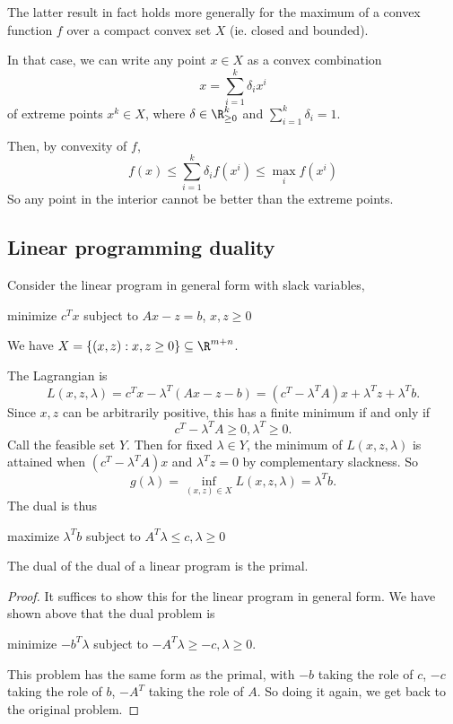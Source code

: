 \documentclass[a4paper]{article}
\begin{document}
The latter result in fact holds more generally for the maximum of a convex function $f$ over a compact convex set $X$ (ie. closed and bounded).

In that case, we can write any point $x\in X$ as a convex combination
\[
  x = \sum_{i = 1}^k \delta_i x^i
\]
of extreme points $x^k\in X$, where $\delta \in \R_{\geq 0}^k$ and $\sum_{i=1}^k \delta_i = 1$.

Then, by convexity of $f$,
\[
  f(x) \leq \sum_{i = 1}^k \delta_i f(x^i) \leq \max_i f(x^i)
\]
So any point in the interior cannot be better than the extreme points.
\subsection{Linear programming duality}
Consider the linear program in general form with slack variables,

\begin{center}
  minimize $c^Tx$ subject to $Ax - z = b$, $x, z\geq 0$
\end{center}
We have $X = \{(x, z): x, z\geq 0\}\subseteq \R^{m + n}$.

The Lagrangian is
\[
  L(x, z, \lambda) = c^Tx - \lambda^T(A x - z - b) = (c^T - \lambda^TA)x + \lambda^T z + \lambda^T b.
\]
Since $x, z$ can be arbitrarily positive, this has a finite minimum if and only if
\[
  c^T - \lambda^TA \geq 0, \lambda^T \geq 0.
\]
Call the feasible set $Y$. Then for fixed $\lambda\in Y$, the minimum of $L(x, z, \lambda)$ is attained when $(c^T - \lambda^T A)x$ and $\lambda^T z = 0$ by complementary slackness. So
\[
  g(\lambda) = \inf_{(x, z) \in X} L(x, z, \lambda) = \lambda^T b.
\]
The dual is thus
\begin{center}
  maximize $\lambda^T b$ subject to $A^T\lambda \leq c, \lambda \geq 0$
\end{center}

\begin{thm}[]
  The dual of the dual of a linear program is the primal.
\end{thm}

\begin{proof}
  It suffices to show this for the linear program in general form. We have shown above that the dual problem is
  \begin{center}
    minimize $-b^T\lambda$ subject to $-A^T \lambda \geq -c, \lambda \geq 0$.
  \end{center}
  This problem has the same form as the primal, with $-b$ taking the role of $c$, $-c$ taking the role of $b$, $-A^T$ taking the role of $A$. So doing it again, we get back to the original problem.
\end{proof}
\end{document}
